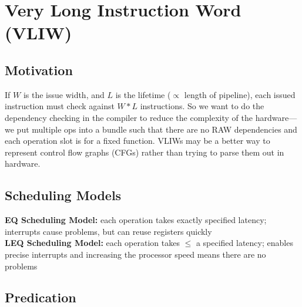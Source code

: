 \documentclass{article}
\begin{document}
\section{Very Long Instruction Word (VLIW)}

\subsection{Motivation}

If $W$ is the issue width, and $L$ is the lifetime ($\propto$ length of pipeline), each issued instruction must check against $W*L$ instructions. So we want to do the dependency checking in the compiler to reduce the complexity of the hardware---we put multiple ops into a bundle such that there are no RAW dependencies and each operation slot is for a fixed function. VLIWs may be a better way to represent control flow graphs (CFGs) rather than trying to parse them out in hardware.

\subsection{Scheduling Models}

\textbf{EQ Scheduling Model:} each operation takes exactly specified latency; interrupts cause problems, but can reuse registers quickly \\
\textbf{LEQ Scheduling Model:} each operation takes $\leq$ a specified latency; enables precise interrupts and increasing the processor speed means there are no problems

\subsection{Predication}
\end{document}
